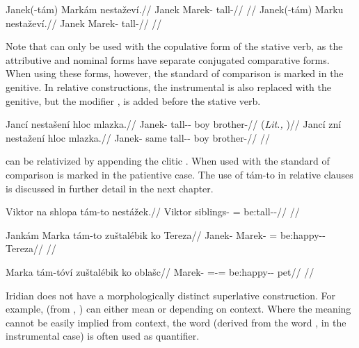 \pex
\a\begingl
\gla Janek(-tám) Markám nestaževí.//
\glb Janek Marek-\Agt{} tall-//
\glft {}//
\endgl
\a\begingl
\gla Janek(-tám) Marku nestaževí.//
\glb Janek Marek-\Ins{} tall-//
\glft {}//
\endgl
\xe

Note that  can only be used with the copulative form of the stative
verb, as the attributive and nominal forms have separate
conjugated comparative forms. When using these forms, however, the standard of
comparison is marked in the genitive. In relative
constructions, the instrumental is also replaced with
the genitive, but the modifier ,  is
added before the stative verb.

\pex
\a
\begingl
\gla Jancí nestašení hloc mlazka.//
\glb Janek-\Gen{} tall-\Comp{}-\Att{} boy brother-\Dim{}//
\glft {} (\emph{Lit.,} )//
\endgl
\a
\begingl
\gla Jancí zní nestažení hloc mlazka.//
\glb Janek-\Gen{} same tall-\Comp{}-\Att{} boy brother-\Dim{}//
\glft {}//
\endgl
\xe

 can be relativized by appending the clitic .
When used with  the standard of comparison is marked in the
patientive case. The use of tám-to in relative clauses is
discussed in further detail in the next chapter.

\ex
\begingl
\gla Viktor na shlopa tám-to nestážek.//
\glb Viktor \Loc{} siblings-\Acc{} \Comp{}=\Rz{} be:tall-\Av{}-\Pf{}//
\glft {}//
\endgl
\xe

\ex
\begingl
\gla Jankám Marka tám-to zuštalébik ko Tereza//
\glb Janek-\Agt{} Marek-\Acc{} \Comp{}=\Rz{} be:happy-\Ben{}-\Pf{} \Lnk{} Tereza//
\glft {}//
\endgl
\xe

\ex
\begingl
\gla Marka tám-tóví zuštalébik ko oblašc//
\glb Marek-\Acc{} \Comp{}=\Rz{}-\Gen{}= be:happy-\Ben{}-\Pf{} \Lnk{} pet//
\glft {}//
\endgl
\xe

Iridian does not have a morphologically distinct superlative construction. For
example,  (from , ) can either mean
 or  depending on context. Where the meaning cannot
be easily implied from context, the word  (derived from the word
,  in the instrumental case) is often used as quantifier.

